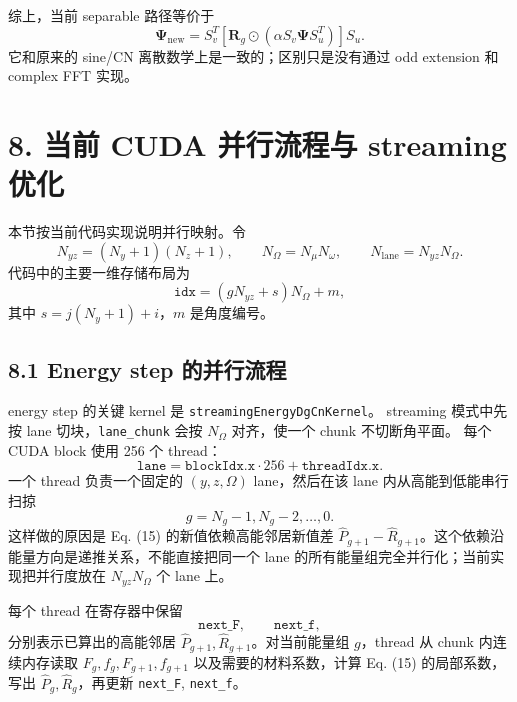\documentclass[11pt,a4paper]{ctexart}
\begin{document}
综上，当前 separable 路径等价于
\begin{equation}
  \mathbf\Psi_{\mathrm{new}}
  =
  S_v^T
  \left[
    \mathbf R_g
    \odot
    \left(
      \alpha S_v \mathbf\Psi S_u^T
    \right)
  \right]
  S_u.
\end{equation}
它和原来的 sine/CN 离散数学上是一致的；区别只是没有通过 odd extension 和 complex FFT 实现。

\section*{8. 当前 CUDA 并行流程与 streaming 优化}

本节按当前代码实现说明并行映射。令
\begin{equation}
  N_{yz}=(N_y+1)(N_z+1),\qquad
  N_\Omega=N_\mu N_\omega,\qquad
  N_{\mathrm{lane}}=N_{yz}N_\Omega.
\end{equation}
代码中的主要一维存储布局为
\begin{equation}
  \texttt{idx}=(gN_{yz}+s)N_\Omega+m,
\end{equation}
其中 \(s=j(N_y+1)+i\)，\(m\) 是角度编号。

\subsection*{8.1 Energy step 的并行流程}

energy step 的关键 kernel 是 \texttt{streamingEnergyDgCnKernel}。
streaming 模式中先按 lane 切块，\texttt{lane\_chunk} 会按 \(N_\Omega\) 对齐，使一个 chunk 不切断角平面。
每个 CUDA block 使用 256 个 thread：
\begin{equation}
  \texttt{lane}=\texttt{blockIdx.x}\cdot256+\texttt{threadIdx.x}.
\end{equation}
一个 thread 负责一个固定的 \((y,z,\Omega)\) lane，然后在该 lane 内从高能到低能串行扫掠
\begin{equation}
  g=N_g-1,N_g-2,\ldots,0.
\end{equation}
这样做的原因是 Eq. (15) 的新值依赖高能邻居新值差
\(\widehat P_{g+1}-\widehat R_{g+1}\)。这个依赖沿能量方向是递推关系，不能直接把同一个 lane
的所有能量组完全并行化；当前实现把并行度放在 \(N_{yz}N_\Omega\) 个 lane 上。

每个 thread 在寄存器中保留
\begin{equation}
  \texttt{next\_F},\qquad \texttt{next\_f},
\end{equation}
分别表示已算出的高能邻居 \(\widehat P_{g+1},\widehat R_{g+1}\)。对当前能量组 \(g\)，thread 从
chunk 内连续内存读取 \(F_g,f_g,F_{g+1},f_{g+1}\) 以及需要的材料系数，计算 Eq. (15) 的局部系数，
写出 \(\widehat P_g,\widehat R_g\)，再更新 \texttt{next\_F}, \texttt{next\_f}。
\end{document}
